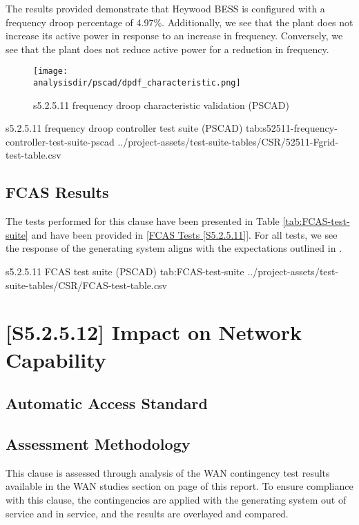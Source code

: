 \documentclass{../grid-link-report}
\newcommand{\projectassetsdir}{../project-assets}
\newcommand{\analysisdir}{report-assets/analysis}
\begin{document}
	The results provided demonstrate that Heywood BESS is configured with a frequency droop percentage of 4.97\%. Additionally, we see that the plant does not increase its active power in response to an increase in frequency. Conversely, we see that the plant does not reduce active power for a reduction in frequency. 
	
	\begin{figure}[H]
		\centering
		\texttt{[image: \\analysisdir/pscad/dpdf\_characteristic.png]}
		\caption{s5.2.5.11 frequency droop characteristic validation (PSCAD)}
		\label{fig:52511-frequency-droop-validation-pscad}
	\end{figure}
	
	{
		\fontsize{5}{7}\selectfont
		\autoscaledlongtable
		{s5.2.5.11 frequency droop controller test suite (PSCAD)}
		{tab:s52511-frequency-controller-test-suite-pscad}
		{\projectassetsdir/test-suite-tables/CSR/52511-Fgrid-test-table.csv}
	}

	\subsection{FCAS Results}
	The tests performed for this clause have been presented in Table \ref{tab:FCAS-test-suite} and have been provided in \ref{FCAS Tests [S5.2.5.11]}. For all tests, we see the response of the generating system aligns with the expectations outlined in \cite{aemo-fcas}.
	
	{
		\fontsize{5}{7}\selectfont
		\autoscaledlongtable
		{s5.2.5.11 FCAS test suite (PSCAD)}
		{tab:FCAS-test-suite}
		{\projectassetsdir/test-suite-tables/CSR/FCAS-test-table.csv}
	}
	
	
	
	\section{[S5.2.5.12] Impact on Network Capability}
	\subsection{Automatic Access Standard}
	\begin{tcolorbox}[lightgreenbox]
		
	\end{tcolorbox}
	\subsection{Assessment Methodology}
	\label{sec:s52512}
	This clause is assessed through analysis of the WAN contingency test results available in the WAN studies section on page \pageref{subsubsec:WAN-results} of this report. To ensure compliance with this clause, the contingencies are applied with the generating system out of service and in service, and the results are overlayed and compared.
	
\end{document}
